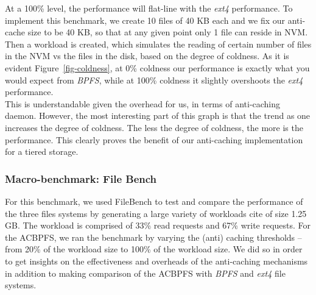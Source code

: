  At a 100\% level, the performance will flat-line with the  \textit{ext4}  performance. To implement this benchmark, we create 10 files of 40 KB each and we fix our anti-cache size to be 40 KB, so that at any given point only 1 file can reside in NVM. Then a workload is created, which simulates the reading of certain number of files in the NVM vs the files in the disk, based on the degree of coldness. As it is evident Figure~\ref{fig-coldness}, at 0\% coldness our performance is exactly what you would expect from \textit{BPFS}, while at 100\% coldness it slightly overshoots the  \textit{ext4}  performance. \\

This is understandable given the overhead for us, in terms of anti-caching daemon. However, the most interesting part of this graph is that the trend as one increases the degree of coldness. The less the degree of coldness, the more is the performance. This clearly proves the benefit of our anti-caching implementation for a tiered storage.

 
\subsubsection{Macro-benchmark: File Bench}
For this benchmark, we used FileBench to test and compare the performance of the three files systems by generating a large variety of workloads {cite} of size 1.25 GB. The workload is comprised of 33\% read requests and 67\% write requests. For the AC\-BPFS, we ran the benchmark by varying the (anti) caching thresholds – from 20\% of the workload size to 100\% of the workload size. We did so in order to get insights on the effectiveness and overheads of the anti-caching mechanisms in addition to making comparison of the AC\-BPFS with \textit{BPFS} and  \textit{ext4}  file systems.


